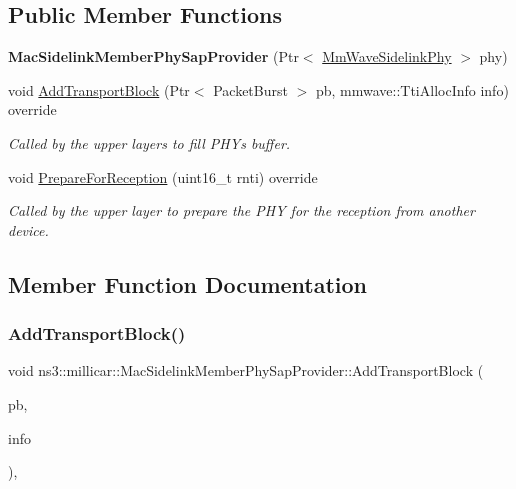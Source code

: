 \subsection*{Public Member Functions}
\begin{DoxyCompactItemize}
\item 
\mbox{\label{classns3_1_1millicar_1_1MacSidelinkMemberPhySapProvider_a82ef934739ad27061d4f59c15cdef118}} 
{\bfseries Mac\+Sidelink\+Member\+Phy\+Sap\+Provider} (Ptr$<$ \hyperlink{classns3_1_1millicar_1_1MmWaveSidelinkPhy}{Mm\+Wave\+Sidelink\+Phy} $>$ phy)
\item 
void \hyperlink{classns3_1_1millicar_1_1MacSidelinkMemberPhySapProvider_ad6a8a2b3021363432e870d4051448b15}{Add\+Transport\+Block} (Ptr$<$ Packet\+Burst $>$ pb, mmwave\+::\+Tti\+Alloc\+Info info) override
\begin{DoxyCompactList}\small\item\em Called by the upper layers to fill P\+HY\textquotesingle{}s buffer. \end{DoxyCompactList}\item 
void \hyperlink{classns3_1_1millicar_1_1MacSidelinkMemberPhySapProvider_afe0a87706052aabc88e7c4fbd4cc7a02}{Prepare\+For\+Reception} (uint16\+\_\+t rnti) override
\begin{DoxyCompactList}\small\item\em Called by the upper layer to prepare the P\+HY for the reception from another device. \end{DoxyCompactList}\end{DoxyCompactItemize}


\subsection{Member Function Documentation}
\mbox{\label{classns3_1_1millicar_1_1MacSidelinkMemberPhySapProvider_ad6a8a2b3021363432e870d4051448b15}} 
\subsubsection{\texorpdfstring{Add\+Transport\+Block()}{AddTransportBlock()}}
{\footnotesize\ttfamily void ns3\+::millicar\+::\+Mac\+Sidelink\+Member\+Phy\+Sap\+Provider\+::\+Add\+Transport\+Block (\begin{DoxyParamCaption}\item[{Ptr$<$ Packet\+Burst $>$}]{pb,  }\item[{mmwave\+::\+Tti\+Alloc\+Info}]{info }\end{DoxyParamCaption})\hspace{0.3cm}{\ttfamily [override]}, {\ttfamily [virtual]}}



